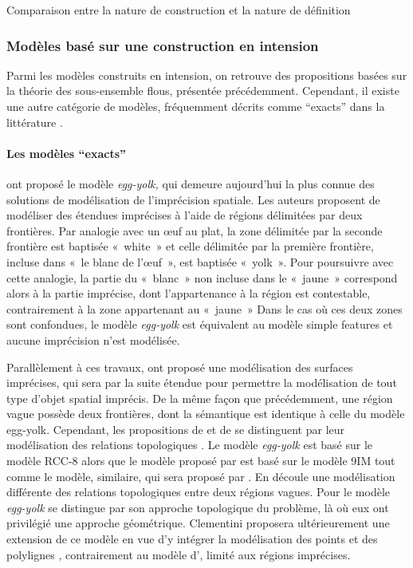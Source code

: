 \begin{table}
  \centering
  
  \caption{Comparaison entre la nature de construction et la nature de définition}
  \label{tab:ext_vs_int}
\end{table}

\subsubsection{Modèles basé sur une construction en intension}

Parmi les modèles construits en intension, on retrouve des
propositions basées sur la théorie des sous-ensemble flous, présentée
précédemment. Cependant, il existe une autre catégorie de modèles,
fréquemment décrits comme \enquote{exacts} dans la littérature
\autocite{Schneider2003,Bejaoui2009}.

\paragraph{Les modèles \enquote{exacts}}

\textcite{Cohn1996} ont proposé le modèle \emph{egg-yolk,} qui demeure
aujourd’hui la plus connue des solutions de modélisation de
l’imprécision spatiale. Les auteurs proposent de modéliser des
étendues imprécises à l’aide de régions délimitées par deux
frontières. Par analogie avec un œuf au plat, la zone délimitée par la
seconde frontière est baptisée « white » et celle délimitée par la
première frontière, incluse dans « le blanc de l’œuf », est baptisée
« yolk ». Pour poursuivre avec cette analogie, la partie du « blanc »
non incluse dans le « jaune » correspond alors à la partie imprécise,
\ie dont l’appartenance à la région est contestable, contrairement à
la zone appartenant au « jaune » Dans le cas où ces deux zones sont
confondues, le modèle \emph{egg-yolk} est équivalent au modèle simple
features et aucune imprécision n’est modélisée.

Parallèlement à ces travaux, \textcite{Clementini1996} ont proposé une
modélisation des surfaces imprécises, qui sera par la suite étendue
pour permettre la modélisation de tout type d’objet spatial
imprécis. De la même façon que précédemment, une région vague possède
deux frontières, dont la sémantique est identique à celle du modèle
egg-yolk. Cependant, les propositions de \textcite{Cohns1996} et de
\textcite{Clementini1996} se distinguent par leur modélisation des
relations topologiques \autocite{Cohn1996}. Le modèle \emph{egg-yolk}
est basé sur le modèle RCC-8 alors que le modèle proposé par
\textcite{Clementini1996} est basé sur le modèle 9IM tout comme le
modèle, similaire, qui sera proposé par \textcite{Erwig1997}. En
découle une modélisation différente des relations topologiques entre
deux régions vagues. Pour \textcite{Clementini1996} le modèle
\emph{egg-yolk} se distingue par son approche topologique du problème,
là où eux ont privilégié une approche géométrique. Clementini
proposera ultérieurement une extension de ce modèle en vue d’y
intégrer la modélisation des points et des polylignes
\autocite{Clementini2005,Clementini2008}, contrairement au modèle
d’\textcite{Erwig1997}, limité aux régions imprécises.

